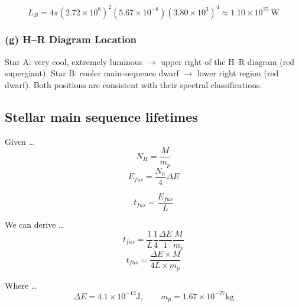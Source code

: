 \documentclass{article}
\begin{document}
\[
L_B = 4\pi(2.72\times10^{8})^2(5.67\times10^{-8})(3.80\times10^{3})^4
     \approx 1.10\times10^{25}~\mathrm{W}
\]

\subsubsection*{(g) H–R Diagram Location}

Star A: very cool, extremely luminous $\rightarrow$ upper right of the H–R diagram (red supergiant).  
Star B: cooler main-sequence dwarf $\rightarrow$ lower right region (red dwarf).  
Both positions are consistent with their spectral classifications.

\begin{table}[htbp]
\end{table}


\subsection{Stellar main sequence lifetimes}
Given \dots
\begin{equation}
    N_H = \frac{M}{m_p} 
    \tag{15.52}
\end{equation}
\begin{equation}
    E_{fus} = \frac{N_h}{4}\Delta E
    \tag{15.53}
\end{equation}

\begin{equation}
    t_{fus} = \frac{E_{fus}}{L}
    \tag{15.54}
\end{equation}

We can derive \dots
    \[t_{fus} = \frac{1}{L} \frac{1}{4} \frac{\Delta E}{1} \frac{M}{m_p}\]
    \[t_{fus} = \frac{\Delta E \times M}{4L\times m_p}\]

Where \dots
    \[\Delta E = 4.1 \times 10^{-12} \text{J}, \qquad m_p = 1.67 \times 10^{-27} \text{kg}\]
\end{document}
